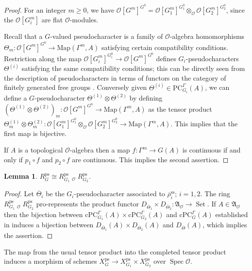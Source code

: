 \documentclass{amsart}
\newtheorem{lem}[prop]{Lemma}
\theoremstyle{definition}
\theoremstyle{remark}
\DeclareMathOperator{\Spec}{Spec}
\DeclareMathOperator{\Set}{Set}
\newcommand{\Aa}{\mathfrak A}
\newcommand{\OO}{\mathcal O}
\DeclareMathOperator{\wtimes}{\widehat{\otimes}}
\newcommand{\rhobar}{\overline{\rho}}
\newcommand{\ps}{\mathrm{ps}}
\newcommand{\rhobarss}{\rhobar^{\mathrm{ss}}}
\newcommand{\PC}{\mathrm{PC}}
\newcommand{\cPC}{\mathrm{cPC}}
\newcommand{\Map}{\mathrm{Map}}
\newcommand{\Thetabar}{\overline{\Theta}}
\begin{document}
\begin{proof} For an integer $m \geq 0$, we have $\OO[G^m]^{G^0} = \OO[G_1^m]^{G_1^0} \otimes_{\OO} \OO[G_2^m]^{G_2^0}$, since the $\OO[G_i^m]$ are flat $\OO$-modules. 

    Recall that a $G$-valued pseudocharacter is a family of $\OO$-algebra homomorphisms $\Theta_m : \OO[G^m]^{G^0} \to \Map(\Gamma^m, A)$ satisfying certain compatibility conditions.
    Restriction along the map $\OO[G_i^m]^{G_i^0} \to \OO[G^m]^{G^0}$ defines
    $G_i$-pseudocharacters $\Theta^{(i)}$ satisfying the same compatibility conditions; this can be directly seen from the description of pseudocharacters in terms of functors on the category of finitely generated free groups \cite[Proposition 3.19]{quast}. Conversely given $\Theta^{(i)} \in \PC_{G_i}^{\Gamma}(A)$, we can define a $G$-pseudocharacter $\Theta^{(1)} \otimes \Theta^{(2)}$ by defining $(\Theta^{(1)} \otimes \Theta^{(2)})_m : \OO[G^m]^{G^0} \to \Map(\Gamma^m, A)$ as the tensor product $\Theta^{(1)}_m \otimes \Theta^{(2)}_m : \OO[G_1^m]^{G_1^0} \otimes_{\OO} \OO[G_2^m]^{G_2^0} \to \Map(\Gamma^m, A)$. This implies that the first map is bijective. 
    
    If $A$ is a topological $\OO$-algebra then a map $f: \Gamma^m \rightarrow G(A)$ is continuous
if and only if $p_1\circ f$ and $p_2\circ f$ are continuous. This implies the second assertion.
\end{proof}

\begin{lem}\label{prod_ps} $R^{\ps}_G \cong R^{\ps}_{G_1}\wtimes_{\OO} R^{\ps}_{G_2}$.
\end{lem}

\begin{proof}
    Let $\Thetabar_i$ be the $G_i$-pseudocharacter associated to $\rhobarss_i$; $i=1,2$.
    The ring $R^{\ps}_{G_1}\wtimes_{\OO} R^{\ps}_{G_2}$ pro-represents the product functor $D_{\Thetabar_1} \times D_{\Thetabar_2} : \Aa_{\OO} \to \Set$.
    If $A\in \Aa_{\OO}$ then the bijection between $\cPC_{G_1}^{\Gamma}(A) \times \cPC_{G_2}^{\Gamma}(A)$ and $\cPC_G^{\Gamma}(A)$
    established in  induces a bijection between 
    $D_{\Thetabar_1}(A) \times D_{\Thetabar_2}(A)$ and $D_{\Thetabar}(A)$, which implies the 
    assertion. 
   \end{proof}

The map from the usual tensor product into the completed tensor product induces
a morphism of schemes $X^{\ps}_G\rightarrow X^{\ps}_{G_1}\times X^{\ps}_{G_2}$ over $\Spec \OO$.
\end{document}
